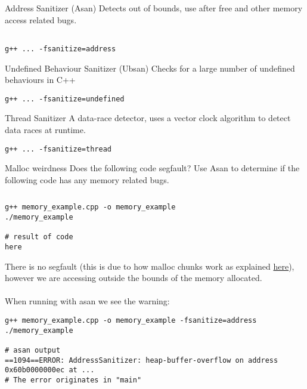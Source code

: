 \begin{tcbraster}[raster columns=2,raster equal height]
\begin{definitionbox}{Address Sanitizer (Asan)}
    Detects out of bounds, use after free and other memory access related bugs.
    \begin{verbatim}

g++ ... -fsanitize=address
    \end{verbatim}
\end{definitionbox}
\begin{definitionbox}{Undefined Behaviour Sanitizer (Ubsan)}
    Checks for a large number of undefined behaviours in C++
    \begin{verbatim}
g++ ... -fsanitize=undefined
    \end{verbatim}
\end{definitionbox}
\end{tcbraster}
\begin{definitionbox}{Thread Sanitizer}
    A data-race detector, uses a vector clock algorithm to detect data races at runtime.
    \begin{verbatim}
g++ ... -fsanitize=thread
    \end{verbatim}
\end{definitionbox}
\begin{examplebox}{Malloc weirdness}
    Does the following code segfault? Use Asan to determine if the following code has any memory related bugs.
    \inputminted{cpp}{tools/code/memory_example.cpp}
    \tcblower
    \begin{verbatim}
g++ memory_example.cpp -o memory_example
./memory_example

# result of code
here
    \end{verbatim}
    There is no segfault (this is due to how malloc chunks work as explained \href{https://sourceware.org/glibc/wiki/MallocInternals}{here}), however we are accessing outside the bounds of the memory allocated.
    \\
    \\ When running with asan we see the warning:
    \begin{verbatim}
g++ memory_example.cpp -o memory_example -fsanitize=address
./memory_example

# asan output
==1094==ERROR: AddressSanitizer: heap-buffer-overflow on address 0x60b0000000ec at ...
# The error originates in "main"
    \end{verbatim}
\end{examplebox}

